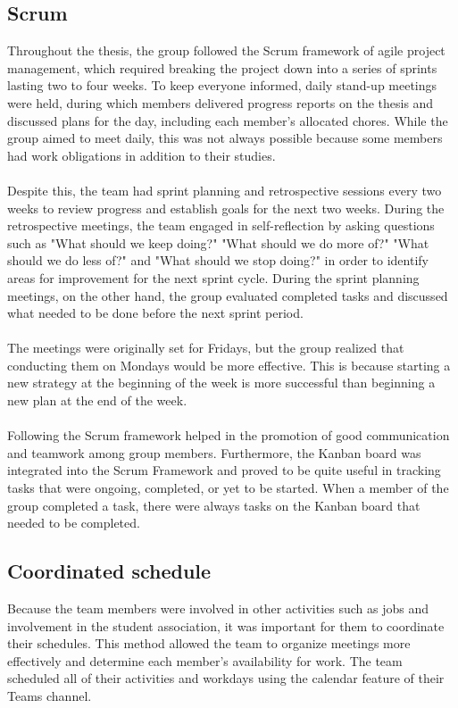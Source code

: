 \subsection{Scrum}
Throughout the thesis, the group followed the Scrum framework of agile project management, which required breaking the project down into a series of sprints lasting two to four weeks. To keep everyone informed, daily stand-up meetings were held, during which members delivered progress reports on the thesis and discussed plans for the day, including each member's allocated chores. While the group aimed to meet daily, this was not always possible because some members had work obligations in addition to their studies.
\\~\\
Despite this, the team had sprint planning and retrospective sessions every two weeks to review progress and establish goals for the next two weeks. During the retrospective meetings, the team engaged in self-reflection by asking questions such as "What should we keep doing?" "What should we do more of?" "What should we do less of?" and "What should we stop doing?" in order to identify areas for improvement for the next sprint cycle. During the sprint planning meetings, on the other hand, the group evaluated completed tasks and discussed what needed to be done before the next sprint period.
\\~\\
The meetings were originally set for Fridays, but the group realized that conducting them on Mondays would be more effective. This is because starting a new strategy at the beginning of the week is more successful than beginning a new plan at the end of the week.
\\~\\
Following the Scrum framework helped in the promotion of good communication and teamwork among group members. Furthermore, the Kanban board was integrated into the Scrum Framework and proved to be quite useful in tracking tasks that were ongoing, completed, or yet to be started. When a member of the group completed a task, there were always tasks on the Kanban board that needed to be completed. 


\subsection{Coordinated schedule}
Because the team members were involved in other activities such as jobs and involvement in the student association, it was important for them to coordinate their schedules. This method allowed the team to organize meetings more effectively and determine each member's availability for work. The team scheduled all of their activities and workdays using the calendar feature of their Teams channel.

